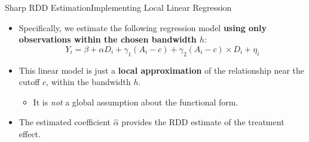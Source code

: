 \documentclass[hyperref={pdfpagelabels=false}]{beamer}
\begin{document}
\begin{frame}{Sharp RDD Estimation}{Implementing Local Linear Regression}
	\begin{itemize}
		\item Specifically, we estimate the following regression model \textbf{using only observations within the chosen bandwidth $h$}:
		\begin{equation*}
			Y_i = \beta +\alpha D_i+ \gamma_1 (A_{i}-c) + \gamma_2 (A_{i}-c) \times D_i +\eta_i
		\end{equation*}
		\item This linear model is just a \textbf{local approximation} of the relationship near the cutoff $c$, within the bandwidth $h$. 
				\vspace{0.2cm}
			\begin{itemize}
		\item It is \textit{not} a global assumption about the functional form.
		\vspace{0.2cm}
			\end{itemize}
		\item The estimated coefficient $\hat{\alpha}$ provides the RDD estimate of the treatment effect.
	\end{itemize}
\end{frame}
\end{document}
